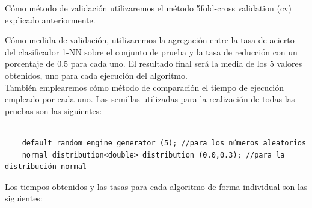 Cómo método de validación utilizaremos el método 5fold-cross validation (cv) explicado anteriormente.

Cómo medida de validación, utilizaremos la agregación entre la tasa de acierto del clasificador 1-NN sobre el conjunto de prueba y la tasa de reducción con un porcentaje de 0.5 para cada uno. El resultado final será la media de los 5 valores obtenidos, uno para cada ejecución del algoritmo.\\ 

También emplearemos cómo método de comparación el tiempo de ejecución empleado por cada uno.
Las semillas utilizadas para la realización de todas las pruebas son las siguientes:
\begin{verbatim}
	
	default_random_engine generator (5); //para los números aleatorios
	normal_distribution<double> distribution (0.0,0.3); //para la distribución normal
\end{verbatim} 
Los tiempos obtenidos y las tasas para cada algoritmo de forma individual son las siguientes:

\noindent
{}%

\noindent
{}%


\noindent
{}%


